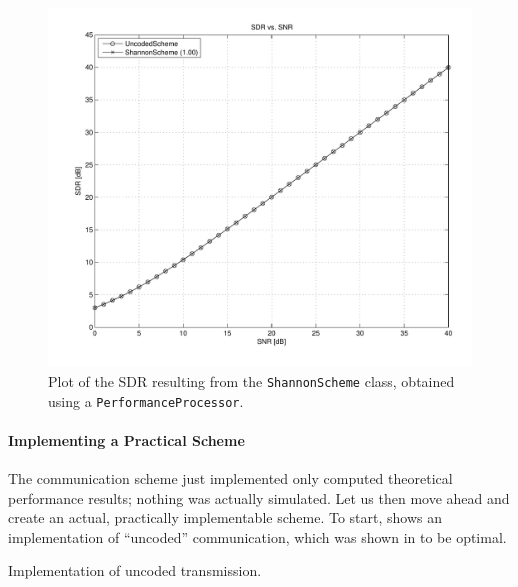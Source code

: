 \begin{figure}
  \begin{center}
    \includegraphics[width=\textwidth]{figures/matlab/ex_shannonscheme.pdf}
  \end{center}
  \caption{Plot of the SDR resulting from the \texttt{ShannonScheme} class,
  obtained using a \texttt{PerformanceProcessor}.}
  \label{fig:shannonschemeperf}
\end{figure}


\paragraph{Implementing a Practical Scheme}
The communication scheme just implemented only computed theoretical performance
results; nothing was actually simulated. Let us then move ahead and create an
actual, practically implementable scheme. To start,  shows an
implementation of ``uncoded'' communication, which was shown in 
to be optimal.

\begin{listing}
  \caption{Implementation of uncoded transmission.}
  \label{lst:uncoded}
\end{listing}

